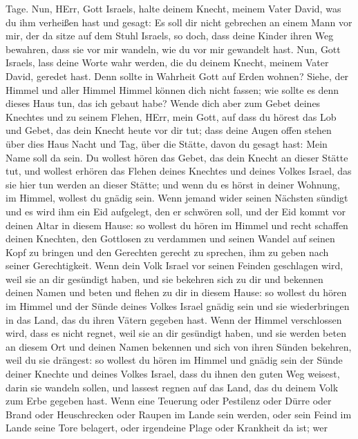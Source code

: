 Tage.  Nun, HErr, Gott Israels, halte deinem Knecht, meinem
Vater David, was du ihm verheißen hast und gesagt: Es soll dir nicht
gebrechen an einem Mann vor mir, der da sitze auf dem Stuhl Israels, so
doch, dass deine Kinder ihren Weg bewahren, dass sie vor mir wandeln,
wie du vor mir gewandelt hast.  Nun, Gott Israels, lass
deine Worte wahr werden, die du deinem Knecht, meinem Vater David,
geredet hast.  Denn sollte in Wahrheit Gott auf Erden
wohnen? Siehe, der Himmel und aller Himmel Himmel können dich nicht
fassen; wie sollte es denn dieses Haus tun, das ich gebaut habe?
 Wende dich aber zum Gebet deines Knechtes und zu seinem
Flehen, HErr, mein Gott, auf dass du hörest das Lob und Gebet, das dein
Knecht heute vor dir tut;  dass deine Augen offen stehen
über dies Haus Nacht und Tag, über die Stätte, davon du gesagt hast:
Mein Name soll da sein. Du wollest hören das Gebet, das dein Knecht an
dieser Stätte tut,  und wollest erhören das Flehen deines
Knechtes und deines Volkes Israel, das sie hier tun werden an dieser
Stätte; und wenn du es hörst in deiner Wohnung, im Himmel, wollest du
gnädig sein.  Wenn jemand wider seinen Nächsten sündigt und
es wird ihm ein Eid aufgelegt, den er schwören soll, und der Eid kommt
vor deinen Altar in diesem Hause:  so wollest du hören im
Himmel und recht schaffen deinen Knechten, den Gottlosen zu verdammen
und seinen Wandel auf seinen Kopf zu bringen und den Gerechten gerecht
zu sprechen, ihm zu geben nach seiner Gerechtigkeit.  Wenn
dein Volk Israel vor seinen Feinden geschlagen wird, weil sie an dir
gesündigt haben, und sie bekehren sich zu dir und bekennen deinen Namen
und beten und flehen zu dir in diesem Hause:  so wollest du
hören im Himmel und der Sünde deines Volkes Israel gnädig sein und sie
wiederbringen in das Land, das du ihren Vätern gegeben hast.
 Wenn der Himmel verschlossen wird, dass es nicht regnet,
weil sie an dir gesündigt haben, und sie werden beten an diesem Ort und
deinen Namen bekennen und sich von ihren Sünden bekehren, weil du sie
drängest:  so wollest du hören im Himmel und gnädig sein
der Sünde deiner Knechte und deines Volkes Israel, dass du ihnen den
guten Weg weisest, darin sie wandeln sollen, und lassest regnen auf das
Land, das du deinem Volk zum Erbe gegeben hast.  Wenn eine
Teuerung oder Pestilenz oder Dürre oder Brand oder Heuschrecken oder
Raupen im Lande sein werden, oder sein Feind im Lande seine Tore
belagert, oder irgendeine Plage oder Krankheit da ist;  wer
